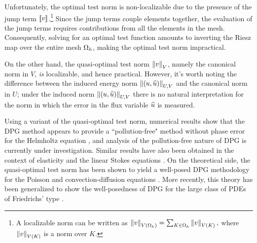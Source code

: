 Unfortunately, the optimal test norm is non-localizable due to the presence of the jump term $\jump{v}$.\footnote{A localizable norm can be written as $\nor{v}_{V(\Oh)} = \sum_{K\in\Oh} \nor{v}_{V(K)},$ where $\nor{v}_{V(K)}$ is a norm over $K$.} Since the jump terms couple elements together, the evaluation of the jump terms requires contributions from all the elements in the mesh. Consequently, solving for an optimal test function
amounts to inverting the Riesz map %
over the entire mesh $\Oh$, making the optimal test norm impractical.

On the other hand, the quasi-optimal test norm $\nor{v}_V$, namely the canonical norm in $V$, \textit{is} localizable, and hence practical. However, it's worth noting the difference between the induced energy norm $\nor{\LRp{u,\uh}}_{U,V}$ and the canonical norm in $U$; under the induced norm $\nor{\LRp{u,\uh}}_{U,V}$ there is no natural interpretation for the norm in which the error in the flux variable $\uh$ is measured. 

Using a variant of the quasi-optimal test norm, numerical results show that the DPG method appears to provide a ``pollution-free" method without phase error for the Helmholtz equation \cite{DPG4}, and analysis of the pollution-free nature of DPG is currently under investigation. Similar results have also been obtained in the context of elasticity \cite{DPGElas} and the linear Stokes equations \cite{Camellia}. On the theoretical side, the quasi-optimal test norm has been shown to yield a well-posed DPG methodology for the Poisson and convection-diffusion equations \cite{analysisDPG}. More recently, this theory has been generalized to show the well-posedness of DPG for the large class of PDEs of Friedrichs' type \cite{Bui-ThanhDemkowiczGhattas11b}.  
